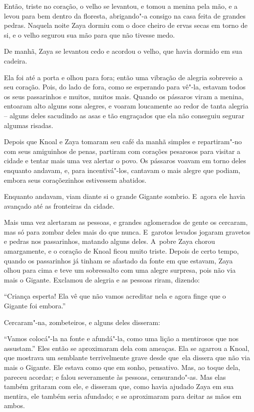 Então, triste no coração, o velho se levantou, e tomou a menina pela
mão, e a levou para bem dentro da floresta, abrigando"-a consigo na casa
feita de grandes pedras. Naquela noite Zaya dormiu com o doce cheiro de
ervas secas em torno de si, e o velho segurou sua mão para que não
tivesse medo.

De manhã, Zaya se levantou cedo e acordou o velho, que havia dormido em
sua cadeira.

Ela foi até a porta e olhou para fora; então uma vibração de alegria
sobreveio a seu coração. Pois, do lado de fora, como se esperando para
vê"-la, estavam todos os seus passarinhos e muitos, muitos mais. Quando
os pássaros viram a menina, entoaram alto alguns sons alegres, e voaram
loucamente ao redor de tanta alegria -- alguns deles sacudindo as
asas e tão engraçados que ela não conseguiu segurar algumas risadas.

Depois que Knoal e Zaya tomaram seu café da manhã simples e
repartiram"-no com seus amiguinhos de penas, partiram com corações
pesarosos para visitar a cidade e tentar mais uma vez alertar o povo. Os
pássaros voavam em torno deles enquanto andavam, e, para
incentivá"-los, cantavam o mais alegre que podiam, embora seus
coraçõezinhos estivessem abatidos.

Enquanto andavam, viam diante si o grande Gigante sombrio. E~agora ele
havia avançado até as fronteiras da cidade.

Mais uma vez alertaram as pessoas, e grandes aglomerados de gente os
cercaram, mas só para zombar deles mais do que nunca. E~garotos levados
jogaram gravetos e pedras nos passarinhos, matando alguns deles. A~pobre
Zaya chorou amargamente, e o coração de Knoal ficou muito triste. Depois
de certo tempo, quando os passarinhos já tinham se afastado da fonte em
que estavam, Zaya olhou para cima e teve um sobressalto com uma alegre
surpresa, pois não via mais o Gigante. Exclamou de alegria e as
pessoas riram, dizendo:

``Criança esperta! Ela vê que não vamos acreditar nela e agora finge que o
Gigante foi embora.''

Cercaram"-na, zombeteiros, e alguns deles disseram:

``Vamos colocá"-la na fonte e afundá"-la, como uma lição a mentirosos que
nos assustam.'' Eles então se aproximaram dela com ameaças. Ela se
agarrou a Knoal, que mostrava um semblante terrivelmente grave desde que~ela dissera que não via mais o Gigante. Ele estava como que em sonho,
pensativo. Mas, ao toque dela, pareceu acordar; e falou severamente às
pessoas, censurando"-as. Mas elas também gritaram com ele, e disseram
que, como havia ajudado Zaya em sua mentira, ele também seria afundado;
e se aproximaram para deitar as mãos em ambos.

